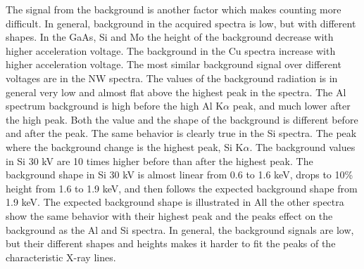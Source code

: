 The signal from the background is another factor which makes counting more difficult.
In general, background in the acquired spectra is low, but with different shapes.
In the GaAs, Si and Mo the height of the background decrease with higher acceleration voltage.
The background in the Cu spectra increase with higher acceleration voltage.
The most similar background signal over different voltages are in the NW spectra. %
The values of the background radiation is in general very low and almost flat above the highest peak in the spectra. %
The Al spectrum background is high before the high Al K$\alpha$ peak, and much lower after the high peak.
Both the value and the shape of the background is different before and after the peak.
The same behavior is clearly true in the Si spectra.
The peak where the background change is the highest peak, Si K$\alpha$.
The background values in Si 30 kV are 10 times higher before than after the highest peak.
The background shape in Si 30 kV is almost linear from 0.6 to 1.6 keV, drops to 10\% height from 1.6 to 1.9 keV, and then follows the expected background shape from 1.9 keV.
The expected background shape is illustrated in  %
All the other spectra show the same behavior with their highest peak and the peaks effect on the background as the Al and Si spectra.
In general, the background signals are low, but their different shapes and heights makes it harder to fit the peaks of the characteristic X-ray lines.



